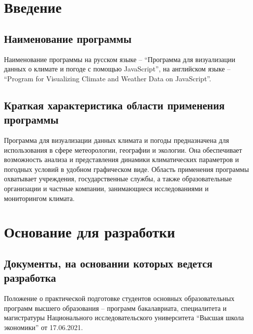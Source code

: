 \documentclass[a4paper, 12pt]{article}
\begin{document}
	\sloppy {}   
	 \firstPage
	\newpage
	\thirdPage

	\section{Введение}\label{section:1}

	\subsection{Наименование программы}\label{section:1.1}

	Наименование программы на русском языке – \enquote{Программа для визуализации данных о климате и погоде с помощью JavaScript},
	на английском языке – \enquote{Program for Visualizing Climate and Weather Data on JavaScript}.

	\subsection{Краткая характеристика области применения программы}\label{section:1.2}

	Программа для визуализации данных климата и погоды предназначена для использования в сфере метеорологии, географии и
	экологии. Она обеспечивает возможность анализа и представления динамики климатических параметров и погодных условий в удобном
	графическом виде. Область применения программы охватывает учреждения, государственные службы, а также образовательные
	организации и частные компании, занимающиеся исследованиями и мониторингом климата.

	\section{Основание для разработки}\label{section:2}

	\subsection{Документы, на основании которых ведется разработка}\label{section:2.1}

	Положение о практической подготовке студентов основных образовательных программ высшего образования – программ бакалавриата,
	специалитета и магистратуры Национального исследовательского университета \enquote{Высшая школа экономики} от 17.06.2021.
\end{document}
